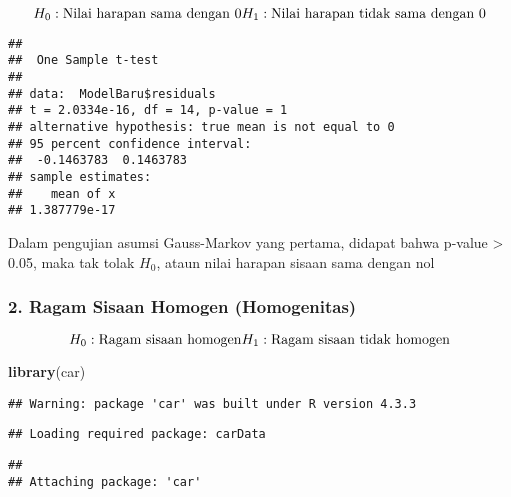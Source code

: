 \documentclass[
]{article}
\newenvironment{Shaded}{\begin{snugshade}}{\end{snugshade}}
\newcommand{\AttributeTok}[1]{\textcolor[rgb]{0.13,0.29,0.53}{#1}}
\newcommand{\DecValTok}[1]{\textcolor[rgb]{0.00,0.00,0.81}{#1}}
\newcommand{\FloatTok}[1]{\textcolor[rgb]{0.00,0.00,0.81}{#1}}
\newcommand{\FunctionTok}[1]{\textcolor[rgb]{0.13,0.29,0.53}{\textbf{#1}}}
\newcommand{\NormalTok}[1]{#1}
\newcommand{\SpecialCharTok}[1]{\textcolor[rgb]{0.81,0.36,0.00}{\textbf{#1}}}
\begin{document}
\[
H_0 : \text{Nilai harapan sama dengan 0}\\H_1 : \text{Nilai harapan tidak sama dengan 0}
\]

\begin{Shaded}
\end{Shaded}

\begin{verbatim}
## 
##  One Sample t-test
## 
## data:  ModelBaru$residuals
## t = 2.0334e-16, df = 14, p-value = 1
## alternative hypothesis: true mean is not equal to 0
## 95 percent confidence interval:
##  -0.1463783  0.1463783
## sample estimates:
##    mean of x 
## 1.387779e-17
\end{verbatim}

Dalam pengujian asumsi Gauss-Markov yang pertama, didapat bahwa p-value
\textgreater{} 0.05, maka tak tolak \(H_0\), ataun nilai harapan sisaan
sama dengan nol

\hypertarget{ragam-sisaan-homogen-homogenitas-1}{%
\subsubsection{2. Ragam Sisaan Homogen
(Homogenitas)}\label{ragam-sisaan-homogen-homogenitas-1}}

\[
H_0 : \text{Ragam sisaan homogen}\\H_1 : \text{Ragam sisaan tidak homogen}
\]

\begin{Shaded}
\begin{Highlighting}[]
\FunctionTok{library}\NormalTok{(car)}
\end{Highlighting}
\end{Shaded}

\begin{verbatim}
## Warning: package 'car' was built under R version 4.3.3
\end{verbatim}

\begin{verbatim}
## Loading required package: carData
\end{verbatim}

\begin{verbatim}
## 
## Attaching package: 'car'
\end{verbatim}
\end{document}
